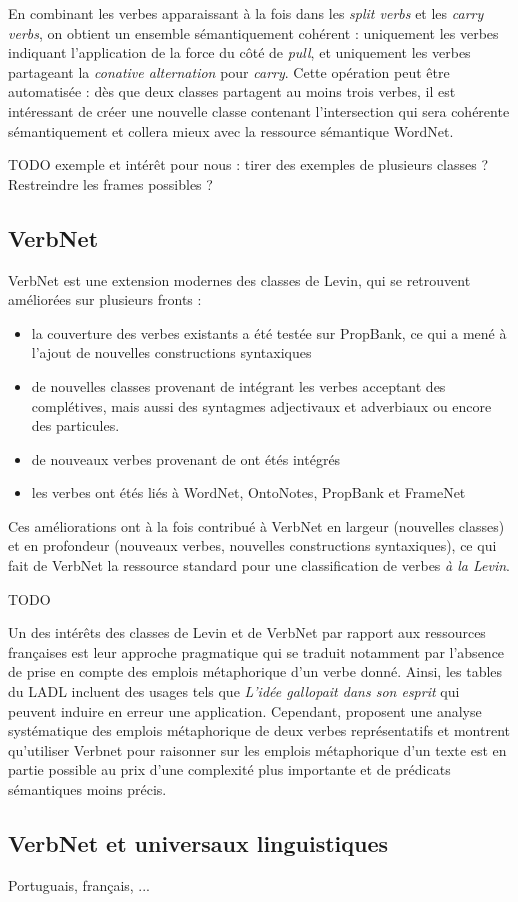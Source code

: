 En combinant les verbes apparaissant à la fois dans les \textit{split verbs} et les \textit{carry verbs}, on obtient un ensemble sémantiquement cohérent : uniquement les verbes indiquant l'application de la force du côté de \textit{pull}, et uniquement les verbes partageant la \textit{conative alternation} pour \textit{carry}. Cette opération peut être automatisée : dès que deux classes partagent au moins trois verbes, il est intéressant de créer une nouvelle classe contenant l'intersection qui sera cohérente sémantiquement et collera mieux avec la ressource sémantique WordNet.


TODO exemple et intérêt pour nous : tirer des exemples de plusieurs classes ? Restreindre les frames possibles ?

\subsection{VerbNet}

VerbNet est une extension modernes des classes de Levin, qui se retrouvent améliorées sur plusieurs fronts :
\begin{itemize}
    \item la couverture des verbes existants a été testée sur PropBank, ce qui a mené à l'ajout de nouvelles constructions syntaxiques
    \item de nouvelles classes provenant de \cite{korhonen2004extended} intégrant les verbes acceptant des complétives, mais aussi des syntagmes adjectivaux et adverbiaux ou encore des particules.
    \item de nouveaux verbes provenant de \cite{dorr2001lcs} ont étés intégrés
    \item les verbes ont étés liés à WordNet, OntoNotes, PropBank et FrameNet \citep{palmer2009semlink}
\end{itemize}

Ces améliorations ont à la fois contribué à VerbNet en largeur (nouvelles classes) et en profondeur (nouveaux verbes, nouvelles constructions syntaxiques), ce qui fait de VerbNet la ressource standard pour une classification de verbes \textit{à la Levin}.

TODO

Un des intérêts des classes de Levin et de VerbNet par rapport aux ressources françaises est leur approche pragmatique qui se traduit notamment par l'absence de prise en compte des emplois métaphorique d'un verbe donné. Ainsi, les tables du LADL incluent des usages tels que \textit{L'idée gallopait dans son esprit} qui peuvent induire en erreur une application. Cependant, \cite{brown2012semantic} proposent une analyse systématique des emplois métaphorique de deux verbes représentatifs et montrent qu'utiliser Verbnet pour raisonner sur les emplois métaphorique d'un texte est en partie possible au prix d'une complexité plus importante et de prédicats sémantiques moins précis.

\subsection{VerbNet et universaux linguistiques}

Portuguais, français, ...
